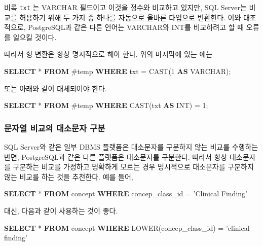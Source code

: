 \documentclass[11pt]{book}
\newenvironment{Shaded}{\begin{snugshade}}{\end{snugshade}}
\newcommand{\KeywordTok}[1]{\textcolor[rgb]{0.13,0.29,0.53}{\textbf{#1}}}
\newcommand{\DataTypeTok}[1]{\textcolor[rgb]{0.13,0.29,0.53}{#1}}
\newcommand{\DecValTok}[1]{\textcolor[rgb]{0.00,0.00,0.81}{#1}}
\newcommand{\StringTok}[1]{\textcolor[rgb]{0.31,0.60,0.02}{#1}}
\newcommand{\FunctionTok}[1]{\textcolor[rgb]{0.00,0.00,0.00}{#1}}
\newcommand{\NormalTok}[1]{#1}
\theoremstyle{definition}
\theoremstyle{definition}
\theoremstyle{definition}
\theoremstyle{remark}
\begin{document}
비록 \texttt{txt} 는 VARCHAR 필드이고 이것을 정수와 비교하고 있지만, SQL
Server는 비교를 허용하기 위해 두 가지 중 하나를 자동으로 올바른 타입으로
변환한다. 이와 대조적으로, PostgreSQL과 같은 다른 언어는 VARCHAR와 INT를
비교하려고 할 때 오류를 일으킬 것이다.

따라서 형 변환은 항상 명시적으로 해야 한다. 위의 마지막에 있는 예는

\begin{Shaded}
\begin{Highlighting}[]
\KeywordTok{SELECT}\NormalTok{ * }\KeywordTok{FROM}\NormalTok{ #temp }\KeywordTok{WHERE}\NormalTok{ txt = }\FunctionTok{CAST}\NormalTok{(}\DecValTok{1} \KeywordTok{AS} \DataTypeTok{VARCHAR}\NormalTok{);}
\end{Highlighting}
\end{Shaded}

또는 아래와 같이 대체되어야 한다.

\begin{Shaded}
\begin{Highlighting}[]
\KeywordTok{SELECT}\NormalTok{ * }\KeywordTok{FROM}\NormalTok{ #temp }\KeywordTok{WHERE} \FunctionTok{CAST}\NormalTok{(txt }\KeywordTok{AS} \DataTypeTok{INT}\NormalTok{) = }\DecValTok{1}\NormalTok{;}
\end{Highlighting}
\end{Shaded}

\subsubsection*{문자열 비교의 대소문자 구분}\label{---}

SQL Server와 같은 일부 DBMS 플랫폼은 대소문자를 구분하지 않는 비교를
수행하는 반면, PostgreSQL과 같은 다른 플랫폼은 대소문자를 구분한다.
따라서 항상 대소문자를 구분하는 비교를 가정하고 명확하게 모르는 경우
명시적으로 대소문자를 구분하지 않는 비교를 하는 것을 추천한다. 예를
들어,

\begin{Shaded}
\begin{Highlighting}[]
\KeywordTok{SELECT}\NormalTok{ * }\KeywordTok{FROM}\NormalTok{ concept }\KeywordTok{WHERE}\NormalTok{ concep_class_id = }\StringTok{'Clinical Finding'}
\end{Highlighting}
\end{Shaded}

대신, 다음과 같이 사용하는 것이 좋다.

\begin{Shaded}
\begin{Highlighting}[]
\KeywordTok{SELECT}\NormalTok{ * }\KeywordTok{FROM}\NormalTok{ concept }\KeywordTok{WHERE} \FunctionTok{LOWER}\NormalTok{(concep_class_id) = }\StringTok{'clinical finding'}
\end{Highlighting}
\end{Shaded}
\end{document}
